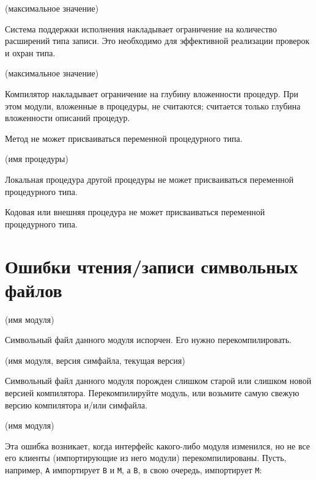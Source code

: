 (максимальное значение)

Система поддержки исполнения накладывает ограничение
на количество расширений типа записи. Это необходимо для эффективной
реализации проверок и охран типа.

(максимальное значение)

Компилятор накладывает ограничение на глубину вложенности процедур.
При этом модули, вложенные в процедуры, не считаются; считается только
глубина вложенности описаний процедур.


Метод не может присваиваться переменной процедурного типа.

(имя процедуры)

Локальная процедура другой процедуры не может присваиваться переменной
процедурного типа.


Кодовая или внешняя процедура не может присваиваться переменной
процедурного типа.

\section{Ошибки чтения/записи символьных файлов}

(имя модуля)

Символьный файл данного модуля испорчен. Его нужно перекомпилировать.

(имя модуля, версия симфайла, текущая версия)

Символьный файл данного модуля порожден слишком старой или слишком
новой версией компилятора. Перекомпилируйте модуль, или возьмите 
самую свежую версию компилятора и/или симфайла.

(имя модуля)

Эта ошибка возникает, когда интерфейс какого-либо модуля изменился,
но не все его клиенты (импортирующие из него модули) перекомпилированы.
Пусть, например, \verb'A' импортирует \verb'B' и \verb'M', а
\verb'B', в свою очередь, импортирует \verb'M':

